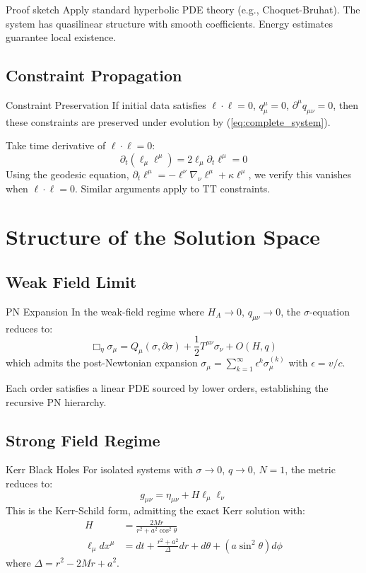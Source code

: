 \documentclass[11pt,a4paper]{article}
\theoremstyle{definition}
\theoremstyle{remark}
\begin{document}
			Proof sketch
			Apply standard hyperbolic PDE theory (e.g., Choquet-Bruhat). The system has quasilinear structure with smooth coefficients. Energy estimates guarantee local existence.
		
		\subsection{Constraint Propagation}
		
		Constraint Preservation
			If initial data satisfies $\ell \cdot \ell = 0$, $q^\mu_\mu = 0$, $\partial^\mu q_{\mu\nu} = 0$, then these constraints are preserved under evolution by (\ref{eq:complete_system}).
		

			Take time derivative of $\ell \cdot \ell = 0$:
			\begin{equation}
				\partial_t(\ell_\mu\ell^\mu) = 2\ell_\mu\partial_t\ell^\mu = 0
			\end{equation}
			Using the geodesic equation, $\partial_t\ell^\mu = -\ell^\nu\nabla_\nu\ell^\mu + \kappa\ell^\mu$, we verify this vanishes when $\ell \cdot \ell = 0$. Similar arguments apply to TT constraints.
		
		\section{Structure of the Solution Space}
		
		\subsection{Weak Field Limit}
		
		PN Expansion
			In the weak-field regime where $H_A \to 0$, $q_{\mu\nu} \to 0$, the $\sigma$-equation reduces to:
			\begin{equation}
				\Box_\eta\sigma_\mu = Q_\mu(\sigma, \partial\sigma) + \frac{1}{2}T^{\mu\nu}\sigma_\nu + O(H, q)
			\end{equation}
			which admits the post-Newtonian expansion $\sigma_\mu = \sum_{k=1}^\infty \epsilon^k\sigma_\mu^{(k)}$ with $\epsilon = v/c$.
		
		Each order satisfies a linear PDE sourced by lower orders, establishing the recursive PN hierarchy.
		
		\subsection{Strong Field Regime}
		
		Kerr Black Holes
			For isolated systems with $\sigma \to 0$, $q \to 0$, $N=1$, the metric reduces to:
			\begin{equation}
				g_{\mu\nu} = \eta_{\mu\nu} + H\ell_\mu\ell_\nu
			\end{equation}
			This is the Kerr-Schild form, admitting the exact Kerr solution with:
			\begin{align}
				H &= \frac{2Mr}{r^2 + a^2\cos^2\theta}\\
				\ell_\mu dx^\mu &= dt + \frac{r^2 + a^2}{\Delta}dr + d\theta + (a\sin^2\theta)d\phi
			\end{align}
			where $\Delta = r^2 - 2Mr + a^2$.
		
\end{document}
